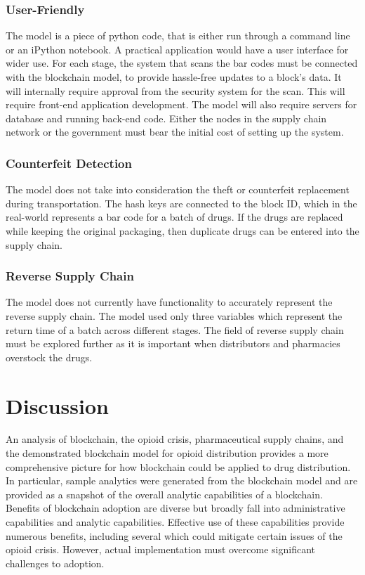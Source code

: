 \documentclass[sigconf]{acmart}
\begin{document}
\subsubsection{User-Friendly} The model is a piece of python code, that is either run through a command line or an iPython notebook. A practical application would have a user interface for wider use. For each stage, the system that scans the bar codes must be connected with the blockchain model, to provide hassle-free updates to a block's data. It will internally require approval from the security system for the scan. This will require front-end application development. The model will also require servers for database and running back-end code. Either the nodes in the supply chain network or the government must bear the initial cost of setting up the system.

\subsubsection{Counterfeit Detection} The model does not take into consideration the theft or counterfeit replacement during transportation. The hash keys are connected to the block ID, which in the real-world represents a bar code for a  batch of drugs. If the drugs are replaced while keeping the original packaging, then duplicate drugs can be entered into the supply chain.

\subsubsection{Reverse Supply Chain} The model does not currently have functionality to accurately represent the reverse supply chain. The model used only three variables which represent the return time of a batch across different stages. The field of reverse supply chain must be explored further as it is important when distributors and pharmacies overstock the drugs. 

\section{Discussion}
An analysis of blockchain, the opioid crisis, pharmaceutical supply chains, and the demonstrated blockchain model for opioid distribution provides a more comprehensive picture for how blockchain could be applied to drug distribution. In particular, sample analytics were generated from the blockchain model and are provided as a snapshot of the overall analytic capabilities of a blockchain. Benefits of blockchain adoption are diverse but broadly fall into administrative capabilities and analytic capabilities. Effective use of these capabilities provide numerous benefits, including several which could mitigate certain issues of the opioid crisis. However, actual implementation must overcome significant challenges to adoption. 
\end{document}
